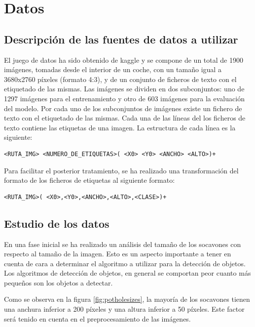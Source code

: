 \section{Datos}

\subsection{Descripción de las fuentes de datos a utilizar}

El juego de datos ha sido obtenido de kaggle \cite{s4_potholedataset} y se compone de un total de 1900 imágenes, tomadas desde el interior de un coche, con un tamaño igual a 3680x2760 píxeles (formato 4:3), y de un conjunto de ficheros de texto con el etiquetado de las mismas. Las imágenes se dividen en dos subconjuntos: uno de 1297 imágenes para el entrenamiento y otro de 603 imágenes para la evaluación del modelo. Por cada uno de los subconjuntos de imágenes existe un fichero de texto con el etiquetado de las mismas. Cada una de las líneas del los ficheros de texto contiene las etiquetas de una imagen. La estructura de cada línea es la siguiente:

\begin{lstlisting}[frame=single,basicstyle=\ttfamily\footnotesize]
<RUTA_IMG> <NUMERO_DE_ETIQUETAS>( <X0> <Y0> <ANCHO> <ALTO>)+
\end{lstlisting}

Para facilitar el posterior tratamiento, se ha realizado una transformación del formato de los ficheros de etiquetas al siguiente formato:

\begin{lstlisting}[frame=single,basicstyle=\ttfamily\footnotesize]
<RUTA_IMG>( <X0>,<Y0>,<ANCHO>,<ALTO>,<CLASE>)+
\end{lstlisting}

\subsection{Estudio de los datos}

En una fase inicial se ha realizado un análisis del tamaño de los socavones con respecto al tamaño de la imagen. Esto es un aspecto importante a tener en cuenta de cara a determinar el algoritmo a utilizar para la detección de objetos. Los algoritmos de detección de objetos, en general se comportan peor cuanto más pequeños son los objetos a detectar.

Como se observa en la figura \ref{fig:potholesizes}, la mayoría de los socavones tienen una anchura inferior a 200 píxeles y una altura inferior a 50 píxeles. Este factor será tenido en cuenta en el preprocesamiento de las imágenes.

